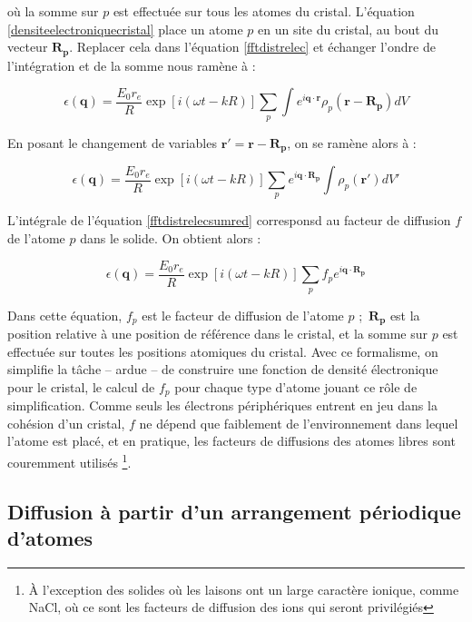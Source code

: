 où la somme sur $p$ est effectuée sur tous les atomes du cristal. L'équation
\ref{densiteelectroniquecristal} place un atome $p$ en un site du cristal, au
bout du vecteur $\mathbf{R_p}$. Replacer cela dans l'équation \ref{fftdistrelec}
et échanger l'ondre de l'intégration et de la somme nous ramène à :

\begin{equation}
   \epsilon(\mathbf{q}) = \frac{E_0 r_e}{R} \exp [i(\omega t - k R)] 
   \sum_p \int e^{i \mathbf{q \cdot r}} \rho_p (\mathbf{r - R_p}) dV
    \label{fftdistrelecsum}
\end{equation}

En posant le changement de variables $\mathbf{r' = r - R_p}$, on se ramène alors
à :

\begin{equation}
    \epsilon(\mathbf{q}) = \frac{E_0 r_e}{R} \exp [i(\omega t - k R)] 
    \sum_p e^{i\mathbf{q \cdot R_p}} \int  \rho_p (\mathbf{r'}) dV'
    \label{fftdistrelecsumred}
\end{equation}

L'intégrale de l'équation \ref{fftdistrelecsumred} corresponsd au facteur de
diffusion $f$ de l'atome $p$ dans le solide. On obtient alors :


\begin{equation}
   \epsilon(\mathbf{q}) = \frac{E_0 r_e}{R} \exp [i(\omega t - k R)] \sum_p  f_p e^{i \mathbf{q \cdot R_p}}
    \label{fftdistrelecsumf}
\end{equation}

Dans cette équation, $f_p$ est le facteur de diffusion de l'atome $p$ ; $\mathbf{R_p}$ est la position relative à une position de référence dans le
cristal, et la somme sur $p$ est effectuée sur toutes les positions atomiques du 
cristal. Avec ce formalisme, on simplifie la tâche -- ardue -- de construire une
fonction de densité électronique pour le cristal, le calcul de $f_p$ pour chaque type d'atome jouant ce rôle de simplification.
Comme seuls les électrons périphériques entrent en jeu dans la cohésion d'un
cristal, $f$ ne dépend que faiblement de l'environnement dans lequel l'atome est
placé, et en pratique, les facteurs de diffusions des atomes libres sont
couremment utilisés \footnote{À l'exception des solides où les laisons ont un
    large caractère ionique, comme NaCl, où ce sont les facteurs de diffusion
des ions qui seront privilégiés}.

\subsection{Diffusion à partir d'un arrangement périodique d'atomes}

